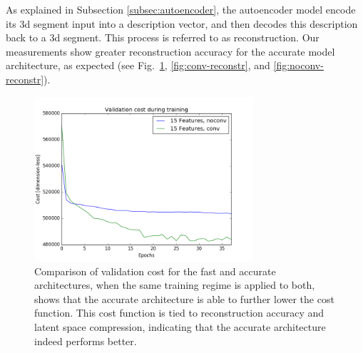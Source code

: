As explained in Subsection \ref{subsec:autoencoder}, the autoencoder model encode its 3d segment input into a description vector, and then decodes this description back to a 3d segment. This process is referred to as reconstruction. Our measurements show greater reconstruction accuracy for the accurate model architecture, as expected (see Fig.~\ref{fig:trainingcost}, \ref{fig:conv-reconstr}, and \ref{fig:noconv-reconstr}).\\

\begin{figure}
  \centering
  \includegraphics[width=3.2in]{images/trainingcost.png}
  \caption{Comparison of validation cost for the fast and accurate architectures, when the same training regime is applied to both, shows that the accurate architecture is able to further lower the cost function. This cost function is tied to reconstruction accuracy and latent space compression, indicating that the accurate architecture indeed performs better.}
  \label{fig:trainingcost}
\end{figure}
 
